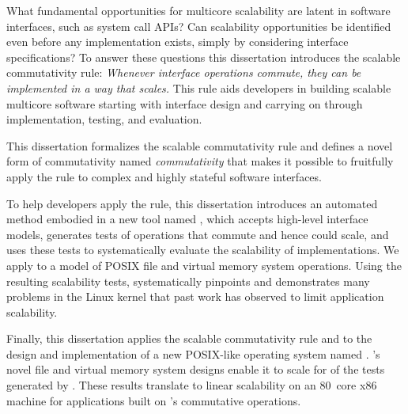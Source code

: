What fundamental opportunities for multicore scalability are latent in
software interfaces, such as system call APIs? Can scalability
opportunities be identified even before any implementation exists,
simply by considering interface specifications?
To answer these
questions this dissertation introduces the scalable commutativity rule:
\emph{Whenever interface operations commute,
they can be implemented in a way that scales.}
This rule aids developers in building scalable multicore software
starting with interface design and
carrying on through implementation, testing, and evaluation.

This dissertation formalizes the scalable commutativity rule and
defines a novel form of commutativity named \emph{\SIM commutativity}
that makes it possible to fruitfully apply the rule to complex and
highly stateful software interfaces.

To help developers apply the rule, this dissertation introduces an
automated method embodied in a new tool named \tool, which accepts
high-level interface models, generates tests of operations that
commute and hence could scale, and uses these tests to systematically
evaluate the scalability of implementations.
%
We apply \tool to a model of  POSIX file and
virtual memory system operations.
%
Using the resulting  scalability tests, \tool
systematically pinpoints and demonstrates many problems in the Linux
kernel that past work has observed to limit application scalability.

Finally, this dissertation applies the scalable commutativity rule and
\tool to the design and implementation of a new POSIX-like operating
system named \sys.
%
\sys's novel file and virtual memory system designs enable it to scale
for  of
the tests generated by \tool.
%
These results translate to linear scalability on an 80~core x86
machine for applications built on \sys's commutative operations.
